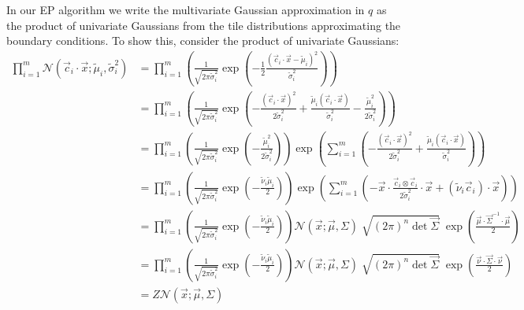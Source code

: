 \documentclass[11pt,twoside]{report}
\begin{document}
In our EP algorithm we write the multivariate Gaussian approximation in $q$ as the product of univariate Gaussians from the tile distributions approximating the boundary conditions.
To show this, consider the product of univariate Gaussians:
\begin{equation}
  \begin{split}
    \prod_{i=1}^m
    \mathcal{N}(\vec{c}_i \cdot \vec{x}; \tilde{\mu}_i, \tilde{\sigma}_i^2)
    &=
    \prod_{i=1}^m
    \left(
    \frac{1}{\sqrt{ 2\pi \tilde{\sigma}_i^2 }}
    \exp{\left(
      - \frac{1}{2} \frac{(\vec{c}_i \cdot \vec{x} - \tilde{\mu}_i)^2}{\tilde{\sigma}_i^2}
      \right)}
    \right)
    \\
    &=
    \prod_{i=1}^m
    \left(
    \frac{1}{\sqrt{ 2\pi \tilde{\sigma}_i^2 }}
    \exp{\left(
      - \frac{(\vec{c}_i \cdot \vec{x})^2}{2\tilde{\sigma}_i^2}
      + \frac{\tilde{\mu}_i(\vec{c}_i \cdot \vec{x})}{\tilde{\sigma}_i^2}
      - \frac{\tilde{\mu}_i^2}{2\tilde{\sigma}_i^2}
      \right)}
    \right)
    \\
    &=
    \prod_{i=1}^m
    \left(
    \frac{1}{\sqrt{ 2\pi \tilde{\sigma}_i^2 }}
    \exp{\left(-\frac{\tilde{\mu}_i^2}{2\tilde{\sigma}_i^2}\right)}
    \right)
    \exp{\left( \sum_{i=1}^m \left(
      - \frac{(\vec{c}_i \cdot \vec{x})^2}{2\tilde{\sigma}_i^2}
      + \frac{\tilde{\mu}_i(\vec{c}_i \cdot \vec{x})}{\tilde{\sigma}_i^2}
      \right) \right)}
    \\
    &=
    \prod_{i=1}^m
    \left(
    \frac{1}{\sqrt{ 2\pi \tilde{\sigma}_i^2 }}
    \exp{\left(-\frac{\tilde{\nu}_i \tilde{\mu}_i}{2}\right)}
    \right)
    \exp{\left( \sum_{i=1}^m \left(
      - \vec{x} \cdot \frac{\vec{c}_i \otimes \vec{c}_i}{2\tilde{\sigma}_i^2} \cdot \vec{x}
      + (\tilde{\nu}_i\vec{c}_i) \cdot \vec{x}
      \right) \right)}
    \\
    &=
    \prod_{i=1}^m
    \left(
    \frac{1}{\sqrt{ 2\pi \tilde{\sigma}_i^2 }}
    \exp{\left(-\frac{\tilde{\nu}_i \tilde{\mu}_i}{2}\right)}
    \right)
    \mathcal{N}(\vec{x}; \vec{\mu}, \Sigma)
    \;
    \sqrt{ (2\pi)^n \det{\vec{\Sigma}} }
    \;
    \exp{\left( \frac{\vec{\mu} \cdot \vec{\Sigma}^{-1} \cdot \vec{\mu}}{2} \right)}
    \\
    &=
    \prod_{i=1}^m
    \left(
    \frac{1}{\sqrt{ 2\pi \tilde{\sigma}_i^2 }}
    \exp{\left(-\frac{\tilde{\nu}_i \tilde{\mu}_i}{2}\right)}
    \right)
    \mathcal{N}(\vec{x}; \vec{\mu}, \Sigma)
    \;
    \sqrt{ (2\pi)^n \det{\vec{\Sigma}} }
    \;
    \exp{\left( \frac{\vec{\nu} \cdot \vec{\Sigma} \cdot \vec{\nu}}{2} \right)}
    \\
    &=
    Z \mathcal{N}(\vec{x}; \vec{\mu}, \Sigma)
  \end{split}
  \label{eq:combined-normals}
\end{equation}
\end{document}
